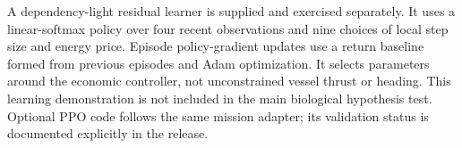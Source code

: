 A dependency-light residual learner is supplied and exercised separately.
It uses a linear-softmax policy over four recent observations and nine choices
of local step size and energy price. Episode policy-gradient updates use a
return baseline formed from previous episodes and Adam optimization.
It selects parameters around the economic controller, not unconstrained
vessel thrust or heading. This learning demonstration is not included in the
main biological hypothesis test. Optional PPO code follows the same mission
adapter; its validation status is documented explicitly in the release.
